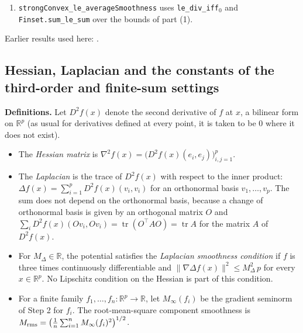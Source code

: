 \documentclass[11pt,a4paper]{report}
\begin{document}
\begin{leanbox}
\begin{enumerate}
\item \texttt{strong\allowbreak{}Convex\_\allowbreak{}le\_\allowbreak{}average\allowbreak{}Smoothness} uses \texttt{le\_\allowbreak{}div\_\allowbreak{}iff\ensuremath{{}_{0}}} and \texttt{Finset.\allowbreak{}sum\_\allowbreak{}le\_\allowbreak{}sum} over the bounds of part (1).

\end{enumerate}
\end{leanbox}


Earlier results used here: \cite[Section~3.2.2]{LangevinLean2026ULASC}.
\subsection{\texorpdfstring{Hessian, Laplacian and the constants of the third-order and finite-sum settings}{Hessian, Laplacian and the constants of the third-order and finite-sum settings}}
\label{report-step-AverageLMC-Assumptions-lean-5}


\textbf{Definitions.} Let \(D^2f(x)\) denote the second derivative of \(f\) at \(x\), a bilinear form on \(\mathbb R^p\) (as usual for derivatives defined at every point, it is taken to be \(0\) where it does not exist).



\begin{itemize}


\item The \emph{Hessian matrix} is \(\nabla^2f(x)=\bigl(D^2f(x)(e_i,e_j)\bigr)_{i,j=1}^p\).

\item The \emph{Laplacian} is the trace of \(D^2f(x)\) with respect to the inner product: \(\Delta f(x)=\sum_{i=1}^pD^2f(x)(v_i,v_i)\) for an orthonormal basis \(v_1,\dots,v_p\). The sum does not depend on the orthonormal basis, because a change of orthonormal basis is given by an orthogonal matrix \(O\) and \(\sum_iD^2f(x)(Ov_i,Ov_i)=\operatorname{tr}(O^\top AO)=\operatorname{tr}A\) for the matrix \(A\) of \(D^2f(x)\).

\item For \(M_\Delta\in\mathbb R\), the potential satisfies the \emph{Laplacian smoothness condition} if \(f\) is three times continuously differentiable and \(\|\nabla\Delta f(x)\|^2\le M_\Delta^2\,p\) for every \(x\in\mathbb R^p\). No Lipschitz condition on the Hessian is part of this condition.

\item For a finite family \(f_1,\dots,f_n:\mathbb R^p\to\mathbb R\), let \(M_\infty(f_i)\) be the gradient seminorm of Step 2 for \(f_i\). The root-mean-square component smoothness is \(M_{\rm rms}=\bigl(\frac1n\sum_{i=1}^nM_\infty(f_i)^2\bigr)^{1/2}\).

\end{itemize}
\end{document}
